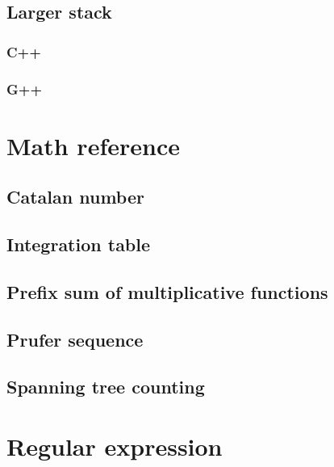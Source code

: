 \documentclass[UTF8,a4paper]{report}
\begin{document}
			\subsection{Larger stack}
				\subsubsection{C++}
					
				\subsubsection{G++}
					
		\section{Math reference}
			\subsection{Catalan number}
				
			\subsection{Integration table}
				
			\subsection{Prefix sum of multiplicative functions}
				
			\subsection{Prufer sequence}
				
			\subsection{Spanning tree counting}
				
		\section{Regular expression}
				
			
\end{document}
